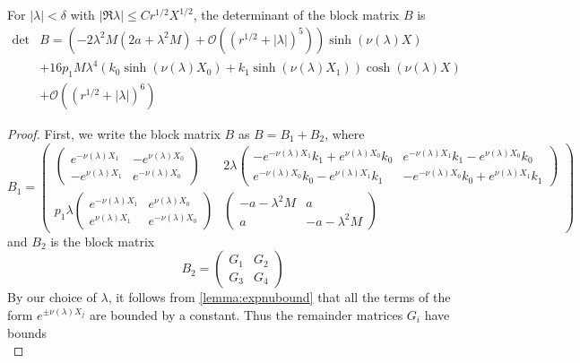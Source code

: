 \documentclass[thesis.tex]{subfiles}
\begin{document}
\begin{lemma}\label{2blockmatrix}
For $|\lambda| < \delta$ with $|\Re \lambda| \leq C r^{1/2}X^{1/2}$, the determinant of the block matrix $B$ is 
\begin{equation}\label{2detBeq}
\begin{aligned}
\det &B = \left(-2 \lambda^2 M (2a + \lambda^2 M) +  \mathcal{O}( (r^{1/2} + |\lambda|)^5 )\right) \sinh(\nu(\lambda)X) \\
&+16 p_1 M \lambda^4 ( k_0\sinh(\nu(\lambda)X_0) + k_1 \sinh(\nu(\lambda)X_1) ) \cosh(\nu(\lambda)X)  \\
&+ \mathcal{O}( (r^{1/2} + |\lambda|)^6) 
\end{aligned}
\end{equation}
\begin{proof}
First, we write the block matrix $B$ as $B = B_1 + B_2$, where
\[
B_1 = \begin{pmatrix}
\begin{pmatrix}
e^{-\nu(\lambda)X_1} & -e^{\nu(\lambda)X_0} \\
-e^{\nu(\lambda)X_1} & e^{-\nu(\lambda)X_0} 
\end{pmatrix} &
2 \lambda \begin{pmatrix}
-e^{-\nu(\lambda)X_1} k_1 + e^{\nu(\lambda)X_0} k_0 & e^{-\nu(\lambda)X_1} k_1 - e^{\nu(\lambda)X_0} k_0 \\ e^{-\nu(\lambda)X_0} k_0 - e^{\nu(\lambda)X_1} k_1 & -e^{-\nu(\lambda)X_0} k_0 + e^{\nu(\lambda)X_1} k_1
\end{pmatrix} \\
p_1 \lambda
\begin{pmatrix}
e^{-\nu(\lambda)X_1} & e^{\nu(\lambda)X_0} \\
e^{\nu(\lambda)X_1} & e^{-\nu(\lambda)X_0} 
\end{pmatrix} &
\begin{pmatrix}
-a - \lambda^2 M & a \\
a & -a - \lambda^2 M
\end{pmatrix}
\end{pmatrix}
\]
and $B_2$ is the block matrix 
\[
B_2 = \begin{pmatrix}
G_1 & G_2 \\ G_3 & G_4
\end{pmatrix}
\]
By our choice of $\lambda$, it follows from \cref{lemma:expnubound} that all the terms of the form $e^{\pm \nu(\lambda)X_j}$ are bounded by a constant. Thus the remainder matrices $G_i$ have bounds
\begin{equation}\label{Gimatrixbounds}

\end{equation}
\end{proof}
\end{lemma}
\end{document}
